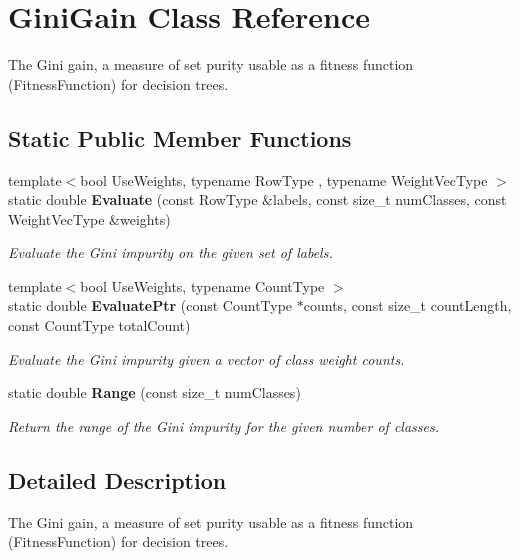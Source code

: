 \section{Gini\+Gain Class Reference}
\label{classmlpack_1_1tree_1_1GiniGain}


The Gini gain, a measure of set purity usable as a fitness function (Fitness\+Function) for decision trees.  


\subsection*{Static Public Member Functions}
\begin{DoxyCompactItemize}
\item 
{\footnotesize template$<$bool Use\+Weights, typename Row\+Type , typename Weight\+Vec\+Type $>$ }\\static double \textbf{ Evaluate} (const Row\+Type \&labels, const size\+\_\+t num\+Classes, const Weight\+Vec\+Type \&weights)
\begin{DoxyCompactList}\small\item\em Evaluate the Gini impurity on the given set of labels. \end{DoxyCompactList}\item 
{\footnotesize template$<$bool Use\+Weights, typename Count\+Type $>$ }\\static double \textbf{ Evaluate\+Ptr} (const Count\+Type $\ast$counts, const size\+\_\+t count\+Length, const Count\+Type total\+Count)
\begin{DoxyCompactList}\small\item\em Evaluate the Gini impurity given a vector of class weight counts. \end{DoxyCompactList}\item 
static double \textbf{ Range} (const size\+\_\+t num\+Classes)
\begin{DoxyCompactList}\small\item\em Return the range of the Gini impurity for the given number of classes. \end{DoxyCompactList}\end{DoxyCompactItemize}


\subsection{Detailed Description}
The Gini gain, a measure of set purity usable as a fitness function (Fitness\+Function) for decision trees. 

